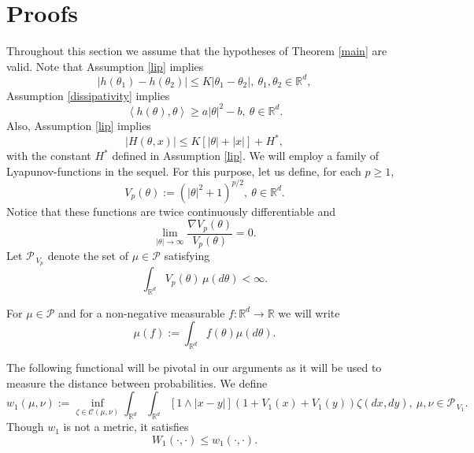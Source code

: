 \documentclass[a4paper,draft]{article}
\begin{document}
\section{Proofs}\label{po}

Throughout this section we assume that the hypotheses of Theorem \ref{main} are valid.
Note that Assumption \ref{lip} implies
\begin{equation}\label{mulyan}
|h(\theta_1)-h(\theta_2)|\leq K|\theta_1-\theta_2|,\ \theta_1,\theta_2\in\mathbb{R}^d,
\end{equation}
Assumption \ref{dissipativity} implies
\begin{equation}\label{laban}
\left\langle h(\theta),\theta\right\rangle\geq a |\theta|^2-b,\ \theta\in\mathbb{R}^d.
\end{equation}
Also, Assumption \ref{lip} implies
\begin{equation}\label{jojo}
|H(\theta,x)|\leq K[|\theta|+|x|]+H^*,
\end{equation}
with the constant $H^*$ defined in Assumption \ref{lip}. 
We will employ a family of Lyapunov-functions in the sequel. For this
purpose, let us define, for each $p\geq 1$,
$$
V_p(\theta):=(|\theta|^2+1)^{p/2},\ \theta\in\mathbb{R}^d.
$$
Notice that these functions are twice continuously differentiable and
\begin{equation}\label{solymos}
\lim_{|\theta|\to\infty}\frac{\nabla V_p(\theta)}{V_p(\theta)}=0.
\end{equation}
Let $\mathcal{P}_{\, V_p}$ denote the set of $\mu\in\mathcal{P}$ satisfying
$$
\int_{\mathbb{R}^d}V_p(\theta)\,\mu(d\theta)<\infty.
$$

For $\mu\in\mathcal{P}$ and for a non-negative measurable $f:\mathbb{R}^d\to\mathbb{R}$
we will write
$$
\mu(f):=\int_{\mathbb{R}^d} f(\theta)\mu(d\theta).
$$

The following functional will be pivotal in our arguments as it will
be used to measure the distance between probabilities. We define
$$
w_1(\mu,\nu):=\inf_{\zeta\in\mathcal{C}(\mu,\nu)}\int_{\mathbb{R}^d}\int_{\mathbb{R}^d} [1\wedge |x-y|](1+V_1(x)+V_1(y))\zeta(dx,dy),\ \mu,\nu\in\mathcal{P}_{\, V_1}.
$$
Though $w_1$ is not a metric, it satisfies 
\begin{equation}\label{lucia}
W_1(\cdot,\cdot)\leq w_1(\cdot,\cdot).
\end{equation}
\end{document}
